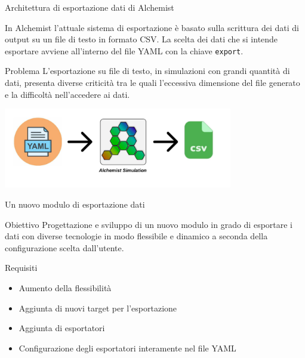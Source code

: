 \documentclass{beamer}
\begin{document}
\begin{frame}{Architettura di esportazione dati di Alchemist}
\begin{block}{In Alchemist}
l’attuale sistema di esportazione è basato sulla scrittura dei dati di output su un file di testo in formato CSV.
La scelta dei dati che si intende esportare avviene all’interno del file YAML con la chiave \texttt{export}.
\end{block}
\begin{alertblock}{Problema}
L'esportazione su file di testo, in simulazioni con grandi quantità di dati, presenta diverse criticità tra le quali l'eccessiva dimensione del file generato e la difficoltà nell'accedere ai dati.
\end{alertblock}
\hfil\hfil\includegraphics[width=10cm,height=3.5cm]{images/csv-export.jpeg}
\end{frame}

\begin{frame}{Un nuovo modulo di esportazione dati}
\begin{block}{Obiettivo}
Progettazione e sviluppo di un nuovo modulo in grado di esportare i dati
con diverse tecnologie in modo flessibile e dinamico a seconda della configurazione scelta dall’utente.
\end{block}
\begin{block}{Requisiti}
\begin{itemize}
    \item Aumento della flessibilità
    \item Aggiunta di nuovi target per l'esportazione
    \item Aggiunta di esportatori
    \item Configurazione degli esportatori interamente nel file YAML
\end{itemize}
\end{block}
\end{frame}
\end{document}
